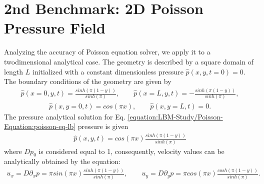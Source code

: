 \documentclass[letterpaper,10pt,english,openany,oneside]{jupyterBook}
\begin{document}
\section{2nd Benchmark: 2D Poisson Pressure Field}
\label{\detokenize{LBM-Study/Poisson-Equation:nd-benchmark-2d-poisson-pressure-field}}
\sphinxAtStartPar
Analyzing the accuracy of Poisson equation solver, we apply it to a two\sphinxhyphen{}dimensional analytical case. The geometry is described by a square domain of length \(L\) initialized with a constant dimensionless pressure \(\widehat{p}(x,y,t=0)=0\). The boundary conditions of the geometry are given by
\begin{equation*}
\begin{split}
\widehat{p}(x=0,y,t)=\displaystyle\frac{sinh\left(\pi(1-y)\right)}{sinh\left(\pi\right)}, \quad \quad \widehat{p}(x=L,y,t)= -\frac{sinh\left(\pi(1-y)\right)}{sinh\left(\pi\right)},
\end{split}
\end{equation*}\begin{equation*}
\begin{split}
\widehat{p}(x,y=0,t)=cos(\pi x), \quad \quad \widehat{p}(x,y=L,t)=0.
\end{split}
\end{equation*}
\sphinxAtStartPar
The pressure analytical solution for Eq. \eqref{equation:LBM-Study/Poisson-Equation:poisson-eq-lb} pressure is given
\begin{equation*}
\begin{split}
    \widehat{p}(x,y,t)=cos(\pi x) \displaystyle\frac{sinh\left(\pi(1-y)\right)}{sinh\left(\pi\right)}
\end{split}
\end{equation*}
\sphinxAtStartPar
where \(Dp_{0}\) is considered equal to 1, consequently, velocity values can be analytically obtained by the equation:
\begin{equation*}
\begin{split}
    u_{x}=D\partial_{x}p= \pi sin(\pi x) \displaystyle\frac{sinh\left(\pi(1-y)\right)}{sinh\left(\pi\right)}, \quad \quad u_{y}=D\partial_{y}p= \pi cos(\pi x) \displaystyle\frac{cosh\left(\pi(1-y)\right)}{sinh\left(\pi\right)}.
\end{split}
\end{equation*}
\end{document}
